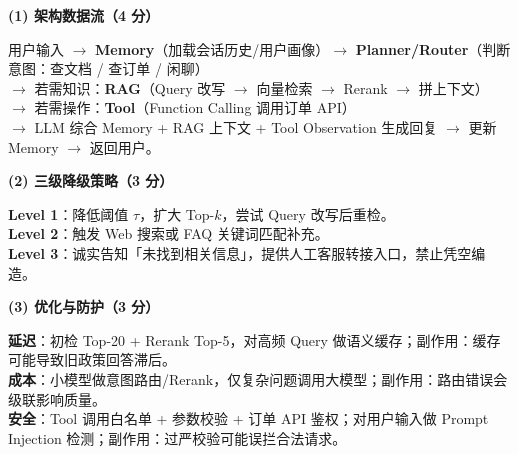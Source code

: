\documentclass[11pt,a4paper]{article}
\begin{document}
\noindent\textbf{(1) 架构数据流（4 分）}

用户输入 $\to$ \textbf{Memory}（加载会话历史/用户画像）$\to$ \textbf{Planner/Router}（判断意图：查文档 / 查订单 / 闲聊）\\
$\to$ 若需知识：\textbf{RAG}（Query 改写 $\to$ 向量检索 $\to$ Rerank $\to$ 拼上下文）\\
$\to$ 若需操作：\textbf{Tool}（Function Calling 调用订单 API）\\
$\to$ LLM 综合 Memory + RAG 上下文 + Tool Observation 生成回复 $\to$ 更新 Memory $\to$ 返回用户。

\noindent\textbf{(2) 三级降级策略（3 分）}

\textbf{Level 1}：降低阈值 $\tau$，扩大 Top-$k$，尝试 Query 改写后重检。\\
\textbf{Level 2}：触发 Web 搜索或 FAQ 关键词匹配补充。\\
\textbf{Level 3}：诚实告知「未找到相关信息」，提供人工客服转接入口，禁止凭空编造。

\noindent\textbf{(3) 优化与防护（3 分）}

\textbf{延迟}：初检 Top-20 + Rerank Top-5，对高频 Query 做语义缓存；副作用：缓存可能导致旧政策回答滞后。\\
\textbf{成本}：小模型做意图路由/Rerank，仅复杂问题调用大模型；副作用：路由错误会级联影响质量。\\
\textbf{安全}：Tool 调用白名单 + 参数校验 + 订单 API 鉴权；对用户输入做 Prompt Injection 检测；副作用：过严校验可能误拦合法请求。
\end{document}
